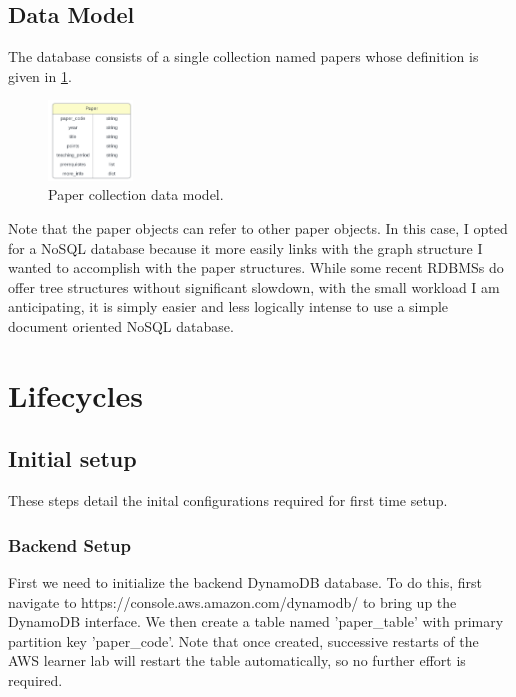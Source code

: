 \documentclass[12pt]{article}
\begin{document}
\subsection{Data Model}
The database consists of a single collection named papers whose definition is given in \ref{fig: paper_data_model}.

\begin{figure}[h!]
    \caption{Paper collection data model.}
    \label{fig: paper_data_model}
    \begin{center}
        \includegraphics[width=0.2\textwidth]{../docs-assets/paper_erd.PNG}
    \end{center}
\end{figure}

Note that the paper objects can refer to other paper objects. In this case, I opted for a NoSQL database because it more easily links with the graph structure I wanted to accomplish with the paper structures. While some recent RDBMSs do offer tree structures without significant slowdown, with the small workload I am anticipating, it is simply easier and less logically intense to use a simple document oriented NoSQL database.

\section{Lifecycles}

\subsection{Initial setup}

These steps detail the inital configurations required for first time setup.

\subsubsection{Backend Setup}

First we need to initialize the backend DynamoDB database. To do this, first navigate to https://console.aws.amazon.com/dynamodb/ to bring up the DynamoDB interface. 
We then create a table named 'paper\_table' with primary partition key 'paper\_code'. Note that once created, successive restarts of the AWS learner lab will restart the table automatically, so no further effort is required. 
\end{document}
